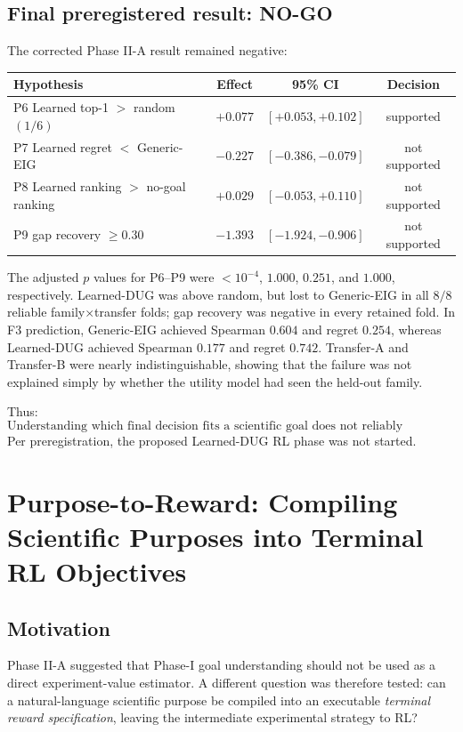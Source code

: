 \documentclass[11pt]{article}
\begin{document}
\subsection{Final preregistered result: NO-GO}
The corrected Phase II-A result remained negative:
\begin{center}
\small
\begin{tabular}{lccc}
\toprule
Hypothesis & Effect & 95\% CI & Decision\\
\midrule
P6 Learned top-1 $>$ random $(1/6)$ & $+0.077$ & $[+0.053,+0.102]$ & supported\\
P7 Learned regret $<$ Generic-EIG & $-0.227$ & $[-0.386,-0.079]$ & not supported\\
P8 Learned ranking $>$ no-goal ranking & $+0.029$ & $[-0.053,+0.110]$ & not supported\\
P9 gap recovery $\ge0.30$ & $-1.393$ & $[-1.924,-0.906]$ & not supported\\
\bottomrule
\end{tabular}
\end{center}
The adjusted $p$ values for P6--P9 were $<10^{-4}$, $1.000$, $0.251$, and $1.000$, respectively. Learned-DUG was above random, but lost to Generic-EIG in all $8/8$ reliable family$\times$transfer folds; gap recovery was negative in every retained fold. In F3 prediction, Generic-EIG achieved Spearman $0.604$ and regret $0.254$, whereas Learned-DUG achieved Spearman $0.177$ and regret $0.742$. Transfer-A and Transfer-B were nearly indistinguishable, showing that the failure was not explained simply by whether the utility model had seen the held-out family.

Thus:
\[
\boxed{
\text{Understanding which final decision fits a scientific goal does not reliably determine which experiment is worth performing.}
}
\]
Per preregistration, the proposed Learned-DUG RL phase was not started.

\section{Purpose-to-Reward: Compiling Scientific Purposes into Terminal RL Objectives}
\subsection{Motivation}
Phase II-A suggested that Phase-I goal understanding should not be used as a direct experiment-value estimator. A different question was therefore tested: can a natural-language scientific purpose be compiled into an executable \emph{terminal reward specification}, leaving the intermediate experimental strategy to RL?
\end{document}
